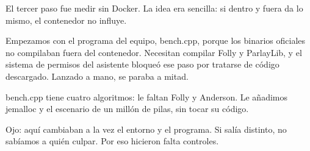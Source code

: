 El tercer paso fue medir sin Docker. La idea era sencilla: si dentro y fuera da lo mismo, el contenedor no influye.

Empezamos con el programa del equipo, bench.cpp, porque los binarios oficiales no compilaban fuera del contenedor. Necesitan compilar Folly y ParlayLib, y el sistema de permisos del asistente bloqueó ese paso por tratarse de código descargado. Lanzado a mano, se paraba a mitad.

bench.cpp tiene cuatro algoritmos: le faltan Folly y Anderson. Le añadimos jemalloc y el escenario de un millón de pilas, sin tocar su código.

Ojo: aquí cambiaban a la vez el entorno y el programa. Si salía distinto, no sabíamos a quién culpar. Por eso hicieron falta controles.
